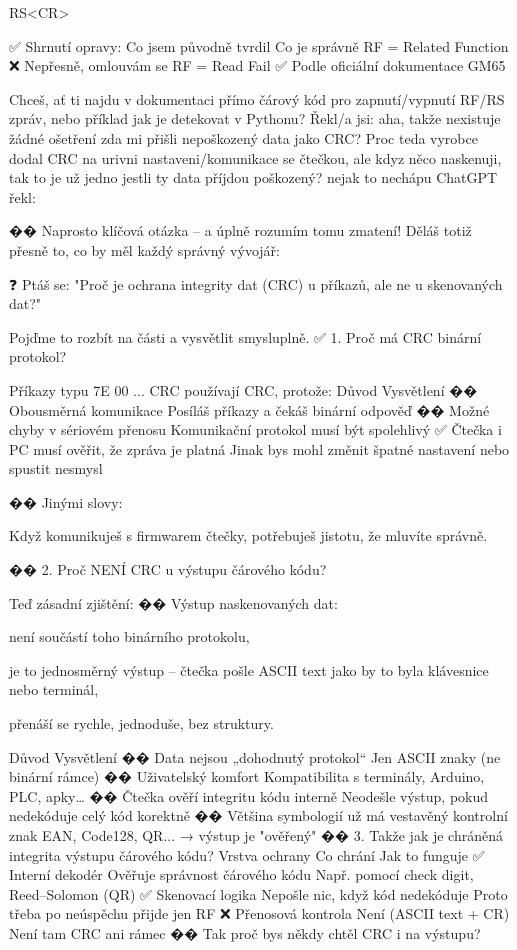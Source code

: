     RS<CR>

✅ Shrnutí opravy:
Co jsem původně tvrdil	Co je správně
RF = Related Function	❌ Nepřesně, omlouvám se
RF = Read Fail	✅ Podle oficiální dokumentace GM65

Chceš, ať ti najdu v dokumentaci přímo čárový kód pro zapnutí/vypnutí RF/RS zpráv, nebo příklad jak je detekovat v Pythonu?
Řekl/a jsi:
aha, takže nexistuje žádné ošetření zda mi přišli nepoškozený data jako CRC? Proc teda vyrobce dodal CRC na urivni nastaveni/komunikace se čtečkou, ale kdyz něco naskenuji, tak to je už jedno jestli ty data příjdou poškozený? nejak to nechápu
ChatGPT řekl:

�� Naprosto klíčová otázka – a úplně rozumím tomu zmatení! Děláš totiž přesně to, co by měl každý správný vývojář:

    ❓ Ptáš se: "Proč je ochrana integrity dat (CRC) u příkazů, ale ne u skenovaných dat?"

Pojďme to rozbít na části a vysvětlit smysluplně.
✅ 1. Proč má CRC binární protokol?

Příkazy typu 7E 00 ... CRC používají CRC, protože:
Důvod	Vysvětlení
�� Obousměrná komunikace	Posíláš příkazy a čekáš binární odpověď
�� Možné chyby v sériovém přenosu	Komunikační protokol musí být spolehlivý
✅ Čtečka i PC musí ověřit, že zpráva je platná	Jinak bys mohl změnit špatné nastavení nebo spustit nesmysl

�� Jinými slovy:

    Když komunikuješ s firmwarem čtečky, potřebuješ jistotu, že mluvíte správně.

�� 2. Proč NENÍ CRC u výstupu čárového kódu?

Teď zásadní zjištění:
�� Výstup naskenovaných dat:

    není součástí toho binárního protokolu,

    je to jednosměrný výstup – čtečka pošle ASCII text jako by to byla klávesnice nebo terminál,

    přenáší se rychle, jednoduše, bez struktury.

Důvod	Vysvětlení
�� Data nejsou „dohodnutý protokol“	Jen ASCII znaky (ne binární rámce)
�� Uživatelský komfort	Kompatibilita s terminály, Arduino, PLC, apky…
�� Čtečka ověří integritu kódu interně	Neodešle výstup, pokud nedekóduje celý kód korektně
�� Většina symbologií už má vestavěný kontrolní znak	EAN, Code128, QR... → výstup je "ověřený"
��️ 3. Takže jak je chráněná integrita výstupu čárového kódu?
Vrstva ochrany	Co chrání	Jak to funguje
✅ Interní dekodér	Ověřuje správnost čárového kódu	Např. pomocí check digit, Reed–Solomon (QR)
✅ Skenovací logika	Nepošle nic, když kód nedekóduje	Proto třeba po neúspěchu přijde jen RF
❌ Přenosová kontrola	Není (ASCII text + CR)	Není tam CRC ani rámec
�� Tak proč bys někdy chtěl CRC i na výstupu?

